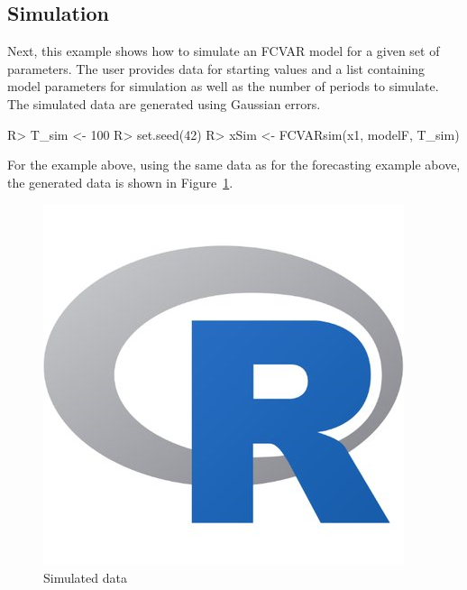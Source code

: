 \documentclass[article]{jss}
\begin{document}

\subsection{Simulation}
\label{sec:simulation}

Next, this example
shows how to simulate an FCVAR model for a given set of parameters. The user provides data for starting values and a list containing model parameters for simulation as well as the number of periods to simulate. The simulated data are generated using Gaussian errors.

\begin{Code}
R> T_sim <- 100
R> set.seed(42)
R> xSim <- FCVARsim(x1, modelF, T_sim)
\end{Code}

For the example above, 
using the same data as for the forecasting example above, 
the generated data is shown in Figure~\ref{fig:sim}.

\begin{figure}[tbh]
  \centering
  \includegraphics[scale = 1, keepaspectratio=true]{Figures/sim.png}
  \caption{Simulated data}
  \label{fig:sim}
\end{figure}




\end{document}
